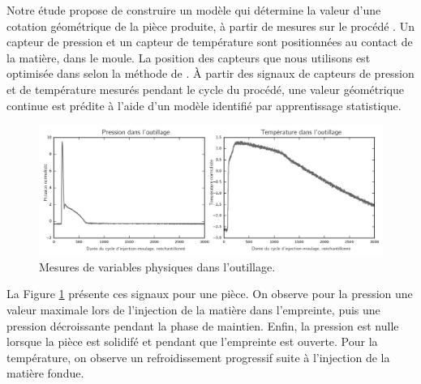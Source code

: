 Notre étude  propose de construire un modèle qui détermine la valeur d'une cotation géométrique de la pièce produite, à partir de mesures sur le procédé \cite{nagorny_quality_2017}.
Un capteur de pression et un capteur de température sont positionnées au contact de la matière, dans le moule.
La position des capteurs que nous utilisons est optimisée dans selon la méthode de \citeauthor{agazzi_optimal_2013} \cite{agazzi_optimal_2013}.
À partir des signaux de capteurs de pression et de température mesurés pendant le cycle du procédé, une valeur géométrique continue est prédite à l'aide d'un modèle identifié par apprentissage statistique.

\begin{figure}[bthp]
	\centering
	\includegraphics[width=\textwidth]{../Chap2/Figures/part1_std_signals.png}
	\caption{Mesures de variables physiques dans l'outillage.}
	\label{fig:inmold_signals}
\end{figure}

La Figure \ref{fig:inmold_signals} présente ces signaux pour une pièce.
On observe pour la pression une valeur maximale lors de l'injection de la matière dans l'empreinte, puis une pression décroissante pendant la phase de maintien. Enfin, la pression est nulle lorsque la pièce est solidifé et pendant que l'empreinte est ouverte.
Pour la température, on observe un refroidissement progressif suite à l'injection de la matière fondue.

